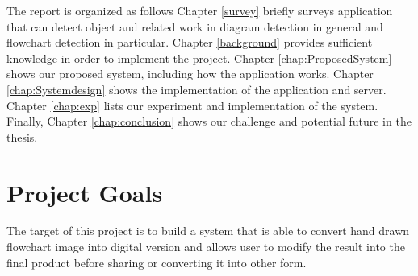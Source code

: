 The report is organized as follows Chapter \ref{survey} briefly surveys application that can detect object and related work in diagram detection in general and flowchart detection in particular. Chapter \ref{background} provides sufficient knowledge in order to implement the project. Chapter \ref{chap:ProposedSystem} shows our proposed system, including how the application works. Chapter \ref{chap:Systemdesign} shows the implementation of the application and server. Chapter \ref{chap:exp} lists our experiment and implementation of the system. Finally, Chapter \ref{chap:conclusion} shows our challenge and potential future in the thesis. \\

\section{Project Goals}

The target of this project is to build a system that is able to convert hand drawn flowchart image into digital version and allows user to modify the result into the final product before sharing or converting it into other form.